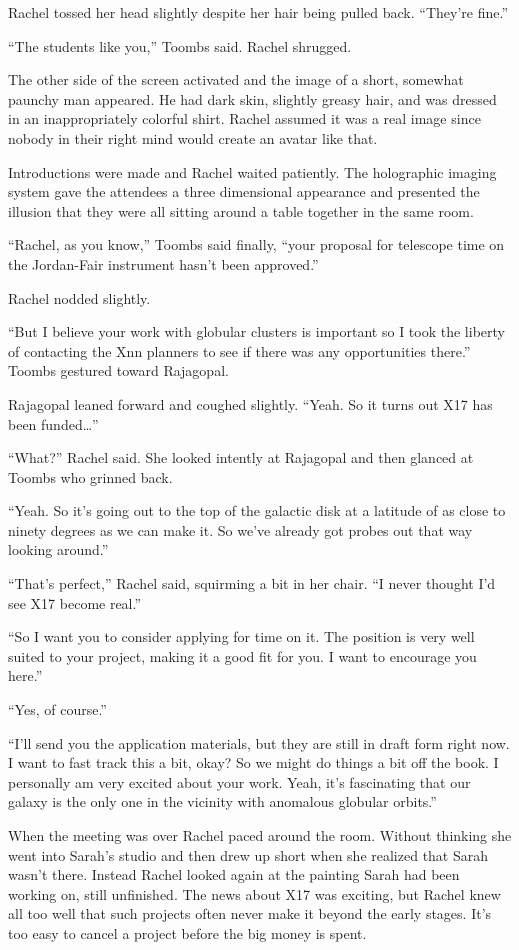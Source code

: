 Rachel tossed her head slightly despite her hair being pulled back. ``They're fine.''

``The students like you,'' Toombs said. Rachel shrugged.

The other side of the screen activated and the image of a short, somewhat paunchy man appeared.
He had dark skin, slightly greasy hair, and was dressed in an inappropriately colorful shirt.
Rachel assumed it was a real image since nobody in their right mind would create an avatar like
that.

Introductions were made and Rachel waited patiently. The holographic imaging system gave the
attendees a three dimensional appearance and presented the illusion that they were all sitting
around a table together in the same room.

``Rachel, as you know,'' Toombs said finally, ``your proposal for telescope time on the
Jordan-Fair instrument hasn't been approved.''

Rachel nodded slightly.

``But I believe your work with globular clusters is important so I took the liberty of
contacting the Xnn planners to see if there was any opportunities there.'' Toombs gestured
toward Rajagopal.

Rajagopal leaned forward and coughed slightly. ``Yeah. So it turns out X17 has been
funded\ldots''

``What?'' Rachel said. She looked intently at Rajagopal and then glanced at Toombs who grinned
back.

``Yeah. So it's going out to the top of the galactic disk at a latitude of as close to ninety
degrees as we can make it. So we've already got probes out that way looking around.''

``That's perfect,'' Rachel said, squirming a bit in her chair. ``I never thought I'd see X17
become real.''

``So I want you to consider applying for time on it. The position is very well suited to your
project, making it a good fit for you. I want to encourage you here.''

``Yes, of course.''

``I'll send you the application materials, but they are still in draft form right now. I want to
fast track this a bit, okay? So we might do things a bit off the book. I personally am very
excited about your work. Yeah, it's fascinating that our galaxy is the only one in the vicinity
with anomalous globular orbits.''

When the meeting was over Rachel paced around the room. Without thinking she went into Sarah's
studio and then drew up short when she realized that Sarah wasn't there. Instead Rachel looked
again at the painting Sarah had been working on, still unfinished. The news about X17 was
exciting, but Rachel knew all too well that such projects often never make it beyond the early
stages. It's too easy to cancel a project before the big money is spent.

